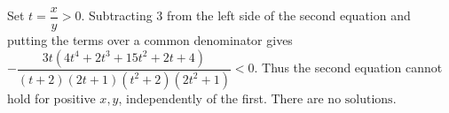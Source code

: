 Set $t = \dfrac{x}{y} > 0$. Subtracting 3 from the left side of the second equation and putting the terms over a common denominator gives $-\dfrac{3t(4t^4+2t^3+15t^2+2t+4)}{(t+2)(2t+1)(t^2+2)(2t^2+1)}<0$. Thus the second equation cannot hold for positive $x,y$, independently of the first. There are $\boxed{\text{no solutions}}$.
